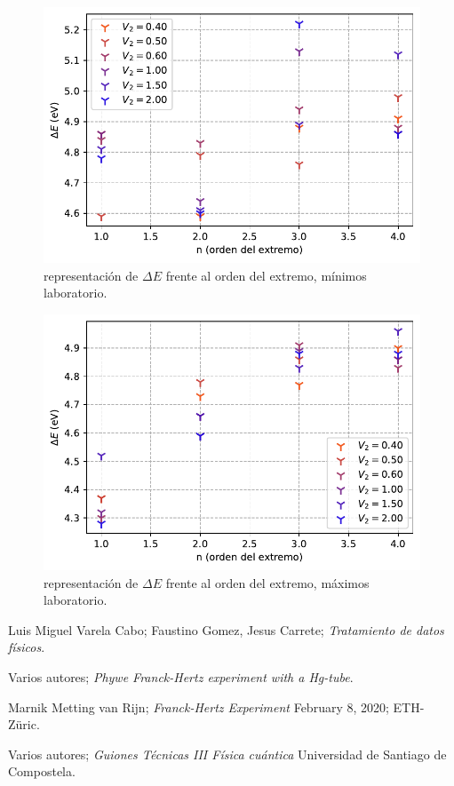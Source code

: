 \documentclass[12pt,a4paper]{article}
\numberwithin{equation}{section}
\numberwithin{figure}{section}
\begin{document}
\newpage

\begin{figure}[h!]  \centering
\includegraphics[scale=1.]{Extremo-minimos-lab.pdf}
\caption{representación de $\Delta E$ frente al orden del extremo, mínimos laboratorio.}
\label{Fig:6.2.2.3}
\end{figure}


\begin{figure}[h!]  \centering
\includegraphics[scale=1.]{Extremo-maximos-lab.pdf}
\caption{representación de $\Delta E$ frente al orden del extremo, máximos laboratorio.}
\label{Fig:6.2.2.4}
\end{figure}

\newpage 


\begin{thebibliography}{n}
 Luis Miguel Varela Cabo; Faustino Gomez, Jesus Carrete;
{\it Tratamiento de datos físicos}.

 Varios autores;
{\it Phywe Franck-Hertz experiment with a Hg-tube}.

 Marnik Metting van Rijn; {\it Franck-Hertz Experiment}
February 8, 2020; ETH-Züric.

 Varios autores; {\it Guiones Técnicas III Física cuántica}
Universidad de Santiago de Compostela.

\end{thebibliography}
\end{document}
